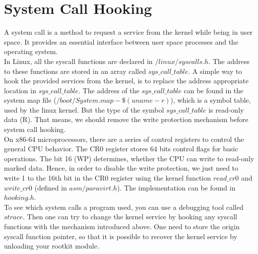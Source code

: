 \section{System Call Hooking}
\label{sec:syscallHooking}
A system call is a method to request a service from the kernel while being in user space. It provides an essential interface between user space processes and the operating system.\\
In Linux, all the syscall functions are declared in $/linux/syscalls.h$. The address to these functions are stored in an array called $sys\_call\_table$. 
A simple way to hook the provided services from the kernel, is to replace the address appropriate location in $sys\_call\_table$. The address of the $sys\_call\_table$ can be found in the system map file ($/boot/System.map-\$(uname -r)$), which is a symbol table, used by the linux kernel. But the type of the symbol $sys\_call\_table$ is read-only data (R). That means, we should remove the write protection mechanism before system call hooking.\\
On x86-64 microprocessors, there are a series of control registers to control the general CPU behavior. The CR0 register stores 64 bits control flags for basic operations. The bit 16 (WP) determines, whether the CPU can write to read-only marked data. Hence, in order to disable the write protection, we just need to write 1 to the 16th bit in the CR0 register using the kernel function $read\_cr0$ and $write\_cr0$ (defined in $asm/paravirt.h$). The implementation can be found in $hooking.h$.\\
To see which system calls a program used, you can use a debugging tool called $strace$. Then one can try to change the kernel service by hooking any syscall functions with the mechanism introduced above. One need to store the origin syscall function pointer, so that it is possible to recover the kernel service by unloading your rootkit module. 


